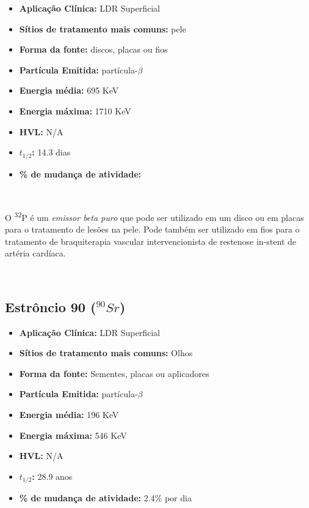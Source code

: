 \documentclass[11pt,a4paper]{article}
\begin{document}
			\begin{itemize}
				\item \textbf{Aplicação Clínica:} LDR Superficial
				\item \textbf{Sítios de tratamento mais comuns:} pele
				\item \textbf{Forma da fonte:} discos, placas ou fios
				\item \textbf{Partícula Emitida:} partícula-$\beta$
				\item \textbf{Energia média: } 695 KeV
				\item \textbf{Energia máxima: } 1710 KeV
				\item \textbf{HVL:} N/A
				\item \textbf{$t_{1/2}$:} 14.3 dias
				\item \textbf{\% de mudança de atividade: } 
			\end{itemize}

			\

			O \textsuperscript{32}P é um \textit{\textcolor{CarnationPink}{emissor beta puro}} que pode ser utilizado em um disco ou em placas para o tratamento de lesões na pele. Pode também ser utilizado em fios para o tratamento de braquiterapia vascular intervencionista de restenose in-stent de artéria cardíaca.

			\

		\subsection{Estrôncio 90 \textbf{\textcolor{CarnationPink}{(${}^{90}Sr$)}}}

			\begin{itemize}
				\item \textbf{Aplicação Clínica:} LDR Superficial
				\item \textbf{Sítios de tratamento mais comuns:} Olhos
				\item \textbf{Forma da fonte:} Sementes, placas ou aplicadores
				\item \textbf{Partícula Emitida:} partícula-$\beta$
				\item \textbf{Energia média: } 196 KeV 
				\item \textbf{Energia máxima: } 546 KeV
				\item \textbf{HVL:} N/A
				\item \textbf{$t_{1/2}$:} 28.9 anos
				\item \textbf{\% de mudança de atividade: } 2.4\% por dia
			\end{itemize}
\end{document}
